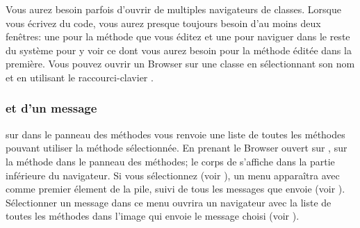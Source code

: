 \documentclass[a4paper,10pt,twoside]{book}
\begin{document}
Vous aurez besoin parfois d'ouvrir de multiples navigateurs de classes.
Lorsque vous écrivez du code, vous aurez presque toujours besoin d'au moins deux
fenêtres: une pour la méthode que vous éditez et une pour naviguer
dans le reste du système pour y voir ce dont vous aurez besoin pour la
méthode éditée dans la première. %
Vous pouvez ouvrir un Browser sur une classe en sélectionnant son nom et en
utilisant le raccourci-clavier  .


\subsubsection{\Senders et \implementors d'un message}


\Actclick sur  dans le
panneau des méthodes vous renvoie une liste de toutes les méthodes
pouvant utiliser la méthode sélectionnée. En prenant le Browser
ouvert sur , \clickz sur la méthode  
dans le panneau des méthodes; le corps de  s'affiche dans
la partie inférieure du navigateur.
Si vous sélectionnez  (voir ), un 
menu apparaîtra avec  comme premier élement de
la pile,  suivi de tous les messages que 
 envoie (voir ). %
Sélectionner un message dans ce menu ouvrira un navigateur avec la
liste de toutes les méthodes dans l'image qui envoie le message
choisi (voir ).


\end{document}
